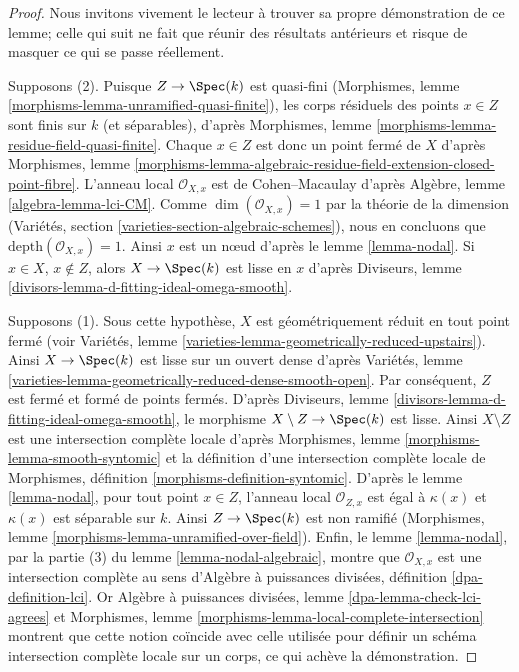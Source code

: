 \begin{proof}
Nous invitons vivement le lecteur à trouver sa propre démonstration de ce lemme; celle qui suit ne fait que réunir des résultats antérieurs et risque de masquer ce qui se passe réellement.

\medskip\noindent
Supposons (2). Puisque $Z \to \Spec(k)$ est quasi-fini (Morphismes, lemme \ref{morphisms-lemma-unramified-quasi-finite}), les corps résiduels des points $x \in Z$ sont finis sur $k$ (et séparables), d'après Morphismes, lemme \ref{morphisms-lemma-residue-field-quasi-finite}. Chaque $x \in Z$ est donc un point fermé de $X$ d'après Morphismes, lemme \ref{morphisms-lemma-algebraic-residue-field-extension-closed-point-fibre}. L'anneau local $\mathcal{O}_{X, x}$ est de Cohen--Macaulay d'après Algèbre, lemme \ref{algebra-lemma-lci-CM}. Comme $\dim(\mathcal{O}_{X, x}) = 1$ par la théorie de la dimension (Variétés, section \ref{varieties-section-algebraic-schemes}), nous en concluons que $\text{depth}(\mathcal{O}_{X, x}) = 1$. Ainsi $x$ est un nœud d'après le lemme \ref{lemma-nodal}. Si $x \in X$, $x \not \in Z$, alors $X \to \Spec(k)$ est lisse en $x$ d'après Diviseurs, lemme \ref{divisors-lemma-d-fitting-ideal-omega-smooth}.

\medskip\noindent
Supposons (1). Sous cette hypothèse, $X$ est géométriquement réduit en tout point fermé (voir Variétés, lemme \ref{varieties-lemma-geometrically-reduced-upstairs}). Ainsi $X \to \Spec(k)$ est lisse sur un ouvert dense d'après Variétés, lemme \ref{varieties-lemma-geometrically-reduced-dense-smooth-open}. Par conséquent, $Z$ est fermé et formé de points fermés. D'après Diviseurs, lemme \ref{divisors-lemma-d-fitting-ideal-omega-smooth}, le morphisme $X \setminus Z \to \Spec(k)$ est lisse. Ainsi $X \setminus Z$ est une intersection complète locale d'après Morphismes, lemme \ref{morphisms-lemma-smooth-syntomic} et la définition d'une intersection complète locale de Morphismes, définition \ref{morphisms-definition-syntomic}. D'après le lemme \ref{lemma-nodal}, pour tout point $x \in Z$, l'anneau local $\mathcal{O}_{Z, x}$ est égal à $\kappa(x)$ et $\kappa(x)$ est séparable sur $k$. Ainsi $Z \to \Spec(k)$ est non ramifié (Morphismes, lemme \ref{morphisms-lemma-unramified-over-field}). Enfin, le lemme \ref{lemma-nodal}, par la partie (3) du lemme \ref{lemma-nodal-algebraic}, montre que $\mathcal{O}_{X, x}$ est une intersection complète au sens d'Algèbre à puissances divisées, définition \ref{dpa-definition-lci}. Or Algèbre à puissances divisées, lemme \ref{dpa-lemma-check-lci-agrees} et Morphismes, lemme \ref{morphisms-lemma-local-complete-intersection} montrent que cette notion coïncide avec celle utilisée pour définir un schéma intersection complète locale sur un corps, ce qui achève la démonstration.
\end{proof}

